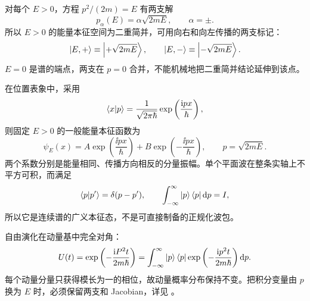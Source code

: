 对每个 $E>0$，方程 $p^2/(2m)=E$ 有两支解
\begin{equation}
  p_\alpha(E)=\alpha\sqrt{2mE},
  \qquad \alpha=\pm.
  \label{eq:QM-C05-S01-energy-branches}
\end{equation}
所以 $E>0$ 的能量本征空间为二重简并，可用向右和向左传播的两支标记：
\begin{equation}
  \left|E,+\right\rangle\equiv\left|+\sqrt{2mE}\right\rangle,
  \qquad
  \left|E,-\right\rangle\equiv\left|-\sqrt{2mE}\right\rangle.
  \label{eq:QM-C05-S01-energy-branch-kets}
\end{equation}
$E=0$ 是谱的端点，两支在 $p=0$ 合并，不能机械地把二重简并结论延伸到该点。

在位置表象中，采用
\begin{equation}
  \left\langle x \middle| p \right\rangle=\frac{1}{\sqrt{2\pi\hbar}}
  \exp\left(\frac{\mathrm{i} px}{\hbar}\right),
  \label{eq:QM-C05-S01-plane-wave}
\end{equation}
则固定 $E>0$ 的一般能量本征函数为
\begin{equation}
  \psi_E(x)=A\exp\left(\frac{\ii px}{\hbar}\right)
  +B\exp\left(-\frac{\ii px}{\hbar}\right),
  \qquad p=\sqrt{2mE}.
  \label{eq:QM-C05-S01-energy-general-solution}
\end{equation}
两个系数分别是能量相同、传播方向相反的分量振幅。单个平面波在整条实轴上不平方可积，而满足
\begin{equation}
  \left\langle p \middle| p' \right\rangle=\delta(p-p'),
  \qquad
  \int_{-\infty}^{\infty}\left|p\right\rangle\left\langle p\right|\mathop{}\!\mathrm{d} p=I,
  \label{eq:QM-C05-S01-momentum-delta-normalization}
\end{equation}
所以它是连续谱的广义本征态，不是可直接制备的正规化波包。

自由演化在动量基中完全对角：
\begin{equation}
  U(t)=\exp\left(-\frac{\mathrm{i} P^2t}{2m\hbar}\right)
  =\int_{-\infty}^{\infty}
  \left|p\right\rangle\left\langle p\right|\exp\left(-\frac{\mathrm{i} p^2t}{2m\hbar}\right)\mathop{}\!\mathrm{d} p.
  \label{eq:QM-C05-S01-momentum-propagator}
\end{equation}
每个动量分量只获得模长为一的相位，故动量概率分布保持不变。把积分变量由 $p$ 换为 $E$ 时，必须保留两支和 Jacobian，详见
。



